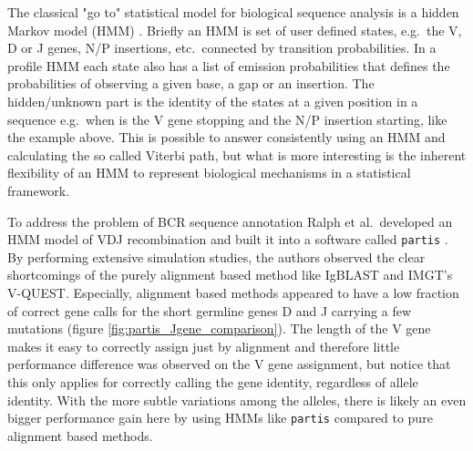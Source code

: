 The classical "go to" statistical model for biological sequence analysis is a hidden Markov model (HMM) \cite{durbin1998biological}.
Briefly an HMM is set of user defined states, e.g.\ the V, D or J genes, N/P insertions, etc.\ connected by transition probabilities.
In a profile HMM each state also has a list of emission probabilities that defines the probabilities of observing a given base, a gap or an insertion.
The hidden/unknown part is the identity of the states at a given position in a sequence e.g.\ when is the V gene stopping and the N/P insertion starting, like the example above.
This is possible to answer consistently using an HMM and calculating the so called Viterbi path, but what is more interesting is the inherent flexibility of an HMM to represent biological mechanisms in a statistical framework.

To address the problem of BCR sequence annotation Ralph et al.\ developed an HMM model of VDJ recombination and built it into a software called \texttt{partis} \cite{ralph2016consistency}.
By performing extensive simulation studies, the authors observed the clear shortcomings of the purely alignment based method like IgBLAST and IMGT's V-QUEST.
Especially, alignment based methods appeared to have a low fraction of correct gene calls for the short germline genes D and J carrying a few mutations (figure \ref{fig:partis_Jgene_comparison}).
The length of the V gene makes it easy to correctly assign just by alignment and therefore little performance difference was observed on the V gene assignment, but notice that this only applies for correctly calling the gene identity, regardless of allele identity.
With the more subtle variations among the alleles, there is likely an even bigger performance gain here by using HMMs like \texttt{partis} compared to pure alignment based methods.

